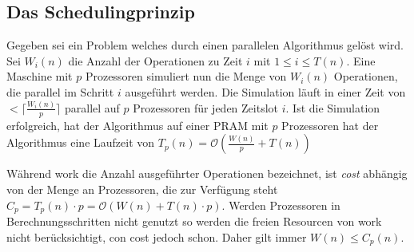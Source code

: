 \subsection{Das Schedulingprinzip}
Gegeben sei ein Problem welches durch einen parallelen Algorithmus gelöst wird.
Sei $W_i(n)$ die Anzahl der Operationen zu Zeit $i$ mit $1 \leq i \leq T(n)$.
Eine Maschine mit $p$ Prozessoren simuliert nun die Menge von $W_i(n)$
Operationen, die parallel im Schritt $i$ ausgeführt werden.
Die Simulation läuft in einer Zeit von $< \lceil \frac{W_i(n)}{p} \rceil$
parallel auf $p$ Prozessoren für jeden Zeitslot $i$.
Ist die Simulation erfolgreich, hat der Algorithmus auf einer PRAM mit $p$
Prozessoren hat der Algorithmus eine Laufzeit von
$T_p(n) = \mathcal{O} \left( \frac{W(n)}{p} + T(n) \right)$
\cite[S.28]{jaja}

Während work die Anzahl ausgeführter Operationen bezeichnet, ist \emph{cost}
abhängig von der Menge an Prozessoren, die zur Verfügung steht
$C_p = T_p(n) \cdot p = \mathcal{O} (W(n) + T(n) \cdot p)$.
Werden Prozessoren in Berechnungsschritten nicht genutzt so werden die freien
Resourcen von work nicht berücksichtigt, con cost jedoch schon.
Daher gilt immer $W(n) \leq C_p(n)$.

